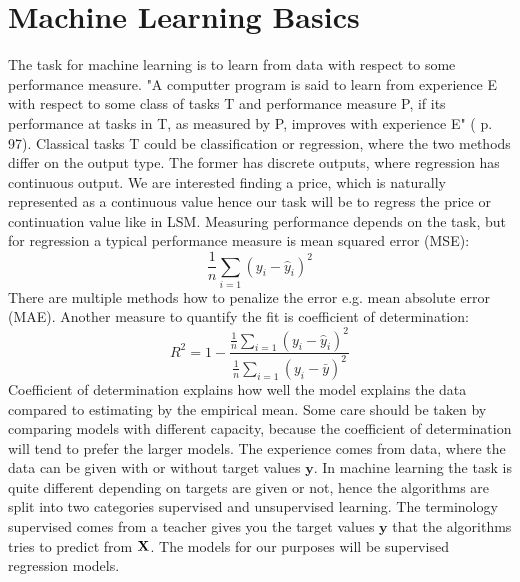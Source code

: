 \section{Machine Learning Basics}
The task for machine learning is to learn from data with respect to some performance measure. "A computter program is said to learn from experience E with respect to some class of tasks T and performance measure P, if its performance at tasks in T, as measured by P, improves with experience E" (\parencite{Goodfellow-et-al-2016} p. 97). Classical tasks T could be classification or regression, where the two methods differ on the output type. The former has discrete outputs, where regression has continuous output. We are interested finding a price, which is naturally represented as a continuous value hence our task will be to regress the price or continuation value like in LSM. Measuring performance depends on the task, but for regression a typical performance measure is mean squared error (MSE):
$$\frac{1}{n}\sum_{i=1} (y_i-\hat{y}_i)^2$$
There are multiple methods how to penalize the error e.g. mean absolute error (MAE). Another measure to quantify the fit is coefficient of determination:\\
$$R^2=1-\frac{\frac{1}{n}\sum_{i=1} (y_i-\hat{y}_i)^2}{\frac{1}{n}\sum_{i=1} (y_i-\bar{y})^2}$$
Coefficient of determination explains how well the model explains the data compared to estimating by the empirical mean. Some care should be taken by comparing models with different capacity, because the coefficient of determination will tend to prefer the larger models. The experience comes from data, where the data can be given with or without target values $\bm{y}$. In machine learning the task is quite different depending on targets are given or not, hence the algorithms are split into two categories supervised and unsupervised learning. The terminology supervised comes from a teacher gives you the target values $\bm{y}$ that the algorithms tries to predict from $\mathbf{X}$. The models for our purposes will be supervised regression models.\\

